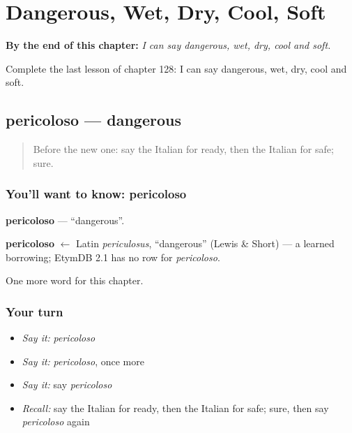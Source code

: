 
\chapter{Dangerous, Wet, Dry, Cool, Soft}
\label{ch:it-dangerous-wet-dry-cool-soft}

\begin{chapteropening}
\textbf{By the end of this chapter:} \emph{I can say dangerous, wet, dry, cool and soft.}

Complete the last lesson of chapter 128: I can say dangerous, wet, dry, cool and soft.
\end{chapteropening}

\section[pericoloso]{pericoloso — dangerous}

\label{lesson:IT-C128-pericoloso}



\begin{quote}
Before the new one: say the Italian for ready, then the Italian for safe; sure.
\end{quote}

\subsection*{You'll want to know: pericoloso}
\textbf{pericoloso} — \textquotedblleft{}dangerous\textquotedblright{}.

\begin{cousinweb}
\textbf{pericoloso} $\leftarrow$ Latin \emph{periculosus}, \textquotedblleft{}dangerous\textquotedblright{} (Lewis \& Short) — a learned borrowing; EtymDB 2.1 has no row for \emph{pericoloso}.
\end{cousinweb}

\begin{grammarlens}[title={What you've built}]
One more word for this chapter.
\end{grammarlens}

\subsection*{Your turn}
\begin{itemize}
\raggedright
  \item \emph{Say it:} \emph{pericoloso}
  \item \emph{Say it:} \emph{pericoloso}, once more
  \item \emph{Say it:} say \emph{pericoloso}
  \item \emph{Recall:} say the Italian for ready, then the Italian for safe; sure, then say \emph{pericoloso} again
\end{itemize}

